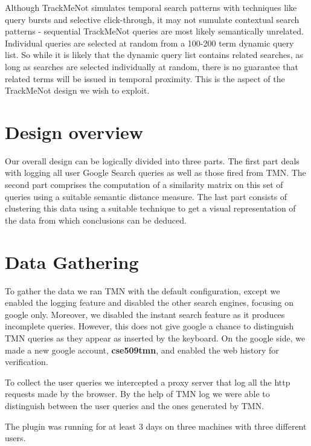 \documentclass[11pt]{article}
\begin{document}
\begin{multicols}{2}
Although TrackMeNot simulates temporal search patterns with techniques
like query bursts and selective click-through, it may not sumulate
contextual search patterns - sequential TrackMeNot queries are most
likely semantically unrelated. Individual queries are selected at
random from a 100-200 term dynamic query list. So while it is likely
that the dynamic query list contains related searches, as long as
searches are selected individually at random, there is no guarantee
that related terms will be issued in temporal proximity. This is the
aspect of the TrackMeNot design we wish to exploit.

\section{Design overview}
\label{sec:design}
Our overall design can be logically divided into three parts. The
first part deals with logging all user Google Search queries as well
as those fired from TMN. The second part comprises the computation of
a similarity matrix on this set of queries using a suitable semantic
distance measure. The last part consists of clustering this data using
a suitable technique to get a visual representation of the data from
which conclusions can be deduced.

\section{Data Gathering}
To gather the data we ran TMN with the default configuration, except we enabled the logging feature and disabled the other search engines, focusing on google only. Moreover, we disabled the instant search feature as it produces incomplete queries. However, this does not give google a chance to distinguish TMN queries as they appear as inserted by the keyboard. On the google side, we made a new google account, \textbf{cse509tmn}, and enabled the web history for verification.

To collect the user queries we intercepted a proxy server that log all the http requests made by the browser. By the help of TMN log we were able to distinguish between the user queries and the ones generated by TMN.

The plugin was running for at least 3 days on three machines with three different users.


\end{multicols}
\end{document}
